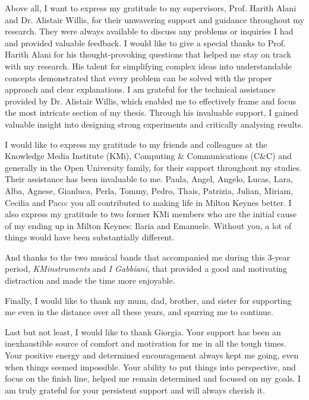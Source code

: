 Above all, I want to express my gratitude to my supervisors, Prof. Harith Alani and Dr. Alistair Willis, for their unwavering support and guidance throughout my research. They were always available to discuss any problems or inquiries I had and provided valuable feedback.
I would like to give a special thanks to Prof. Harith Alani for his thought-provoking questions that helped me stay on track with my research. His talent for simplifying complex ideas into understandable concepts demonstrated that every problem can be solved with the proper approach and clear explanations.
I am grateful for the technical assistance provided by Dr. Alistair Willis, which enabled me to effectively frame and focus the most intricate section of my thesis. Through his invaluable support, I gained valuable insight into designing strong experiments and critically analysing results.


I would like to express my gratitude to my friends and colleagues at the Knowledge Media Institute (KMi), Computing \& Communications (C\&C) and generally in the Open University family, for their support throughout my studies. Their assistance has been invaluable to me. Paula, Angel, Angelo, Lucas, Lara, Alba, Agnese, Gianluca, Perla, Tommy, Pedro, Thais, Patrizia, Julian, Miriam, Cecilia and Paco: you all contributed to making life in Milton Keynes better.
I also express my gratitude to two former KMi members who are the initial cause of my ending up in Milton Keynes: Ilaria and Emanuele. Without you, a lot of things would have been substantially different.

And thanks to the two musical bands that accompanied me during this 3-year period, \emph{KMinstruments} and \emph{I Gabbiani}, that provided a good and motivating distraction and made the time more enjoyable.

Finally, I would like to thank my mum, dad, brother, and sister for supporting me even in the distance over all these years, and spurring me to continue.%

Last but not least, I would like to thank Giorgia.
Your support has been an inexhaustible source of comfort and motivation for me in all the tough times. Your positive energy and determined encouragement always kept me going, even when things seemed impossible. Your ability to put things into perspective, and focus on the finish line, helped me remain determined and focused on my goals. I am truly grateful for your persistent support and will always cherish it.

